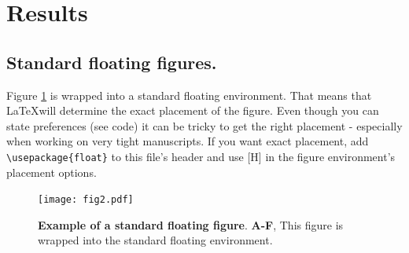 \documentclass[10pt,letterpaper]{article}
\begin{document}
\section*{Results}
\subsection*{Standard floating figures.}
Figure \ref{fig2} is wrapped into a standard floating environment. That means that \LaTeX will determine the exact placement of the figure. Even though you can state preferences (see code) it can be tricky to get the right placement - especially when working on very tight manuscripts. If you want exact placement, add \verb!\usepackage{float}! to this file's header and use [H] in the figure environment's placement options.


\begin{figure}[ht] %


\texttt{[image: fig2.pdf]}

\caption{\color{Gray} \textbf{Example of a standard floating figure}. \textbf{A-F}, This figure is wrapped into the standard floating environment.}

\label{fig2} %

\end{figure}
\end{document}
